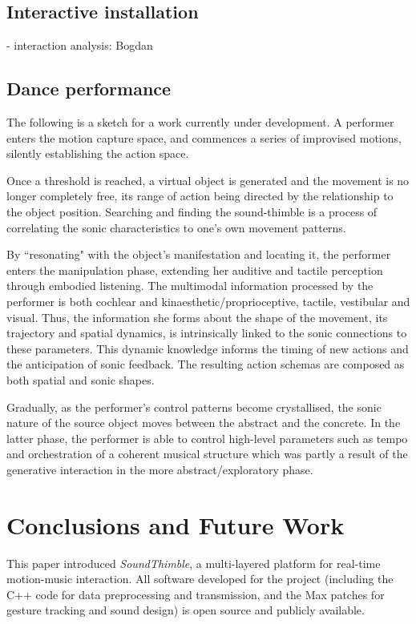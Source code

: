 \documentclass{nime-alternate}
\begin{document}
\subsection{Interactive installation}

- interaction analysis: Bogdan

\subsection{Dance performance}

The following is a sketch for a work currently under development. A performer enters the motion capture space, and commences a series of improvised motions, silently establishing the action space.

Once a threshold is reached, a virtual object is generated and the movement is no longer completely free, its range of action being directed by the relationship to the object position. Searching and finding the sound-thimble is a process of correlating the sonic characteristics to one's own movement patterns.

By ``resonating" with the object's manifestation and locating it, the performer enters the manipulation phase, extending her auditive and tactile perception through embodied listening. The multimodal information processed by the performer is both cochlear and kinaesthetic/proprioceptive, tactile, vestibular and visual. Thus, the information she forms about the shape of the movement, its trajectory and spatial dynamics, is intrinsically linked to the sonic connections to these parameters. This dynamic knowledge informs the timing of new actions and the anticipation of sonic feedback. The resulting action schemas are composed as both spatial and sonic shapes.

Gradually, as the performer's control patterns become crystallised, the sonic nature of the source object moves between the abstract and the concrete. In the latter phase, the performer is able to control high-level parameters such as tempo and orchestration of a coherent musical structure which was partly a result of the generative interaction in the more abstract/exploratory phase.



\section{Conclusions and Future Work}
\label{sec:conc}

This paper introduced \textit{SoundThimble}, a multi-layered platform for real-time motion-music interaction.
All software developed for the project (including the C++ code for data preprocessing and transmission, and the Max patches for gesture tracking and sound design) is open source and publicly available.
\end{document}

